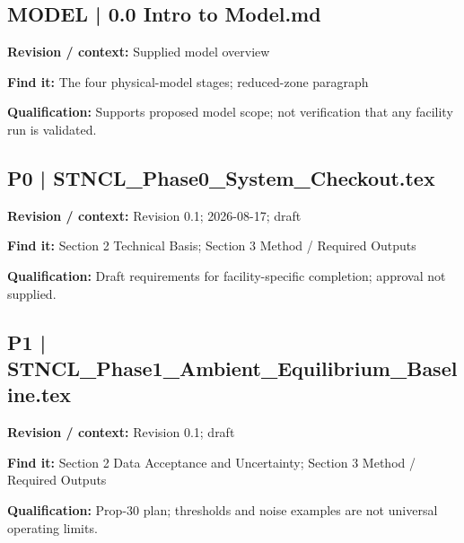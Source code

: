 \documentclass[11pt]{article}
\begin{document}
\par\noindent\begin{minipage}{\textwidth}\small
\subsection*{MODEL | 0.0 Intro to Model.md}
\textbf{Revision / context:} Supplied model overview\par
\textbf{Find it:} The four physical-model stages; reduced-zone paragraph\par
\textbf{Qualification:} Supports proposed model scope; not verification that any facility run is validated.\par
\end{minipage}\par\vspace{5pt}
\par\noindent\begin{minipage}{\textwidth}\small
\subsection*{P0 | STNCL\_\allowbreak{}Phase0\_\allowbreak{}System\_\allowbreak{}Checkout.tex}
\textbf{Revision / context:} Revision 0.1; 2026-08-17; draft\par
\textbf{Find it:} Section 2 Technical Basis; Section 3 Method / Required Outputs\par
\textbf{Qualification:} Draft requirements for facility-specific completion; approval not supplied.\par
\end{minipage}\par\vspace{5pt}
\par\noindent\begin{minipage}{\textwidth}\small
\subsection*{P1 | STNCL\_\allowbreak{}Phase1\_\allowbreak{}Ambient\_\allowbreak{}Equilibrium\_\allowbreak{}Baseline.tex}
\textbf{Revision / context:} Revision 0.1; draft\par
\textbf{Find it:} Section 2 Data Acceptance and Uncertainty; Section 3 Method / Required Outputs\par
\textbf{Qualification:} Prop-30 plan; thresholds and noise examples are not universal operating limits.\par
\end{minipage}\par\vspace{5pt}
\end{document}
